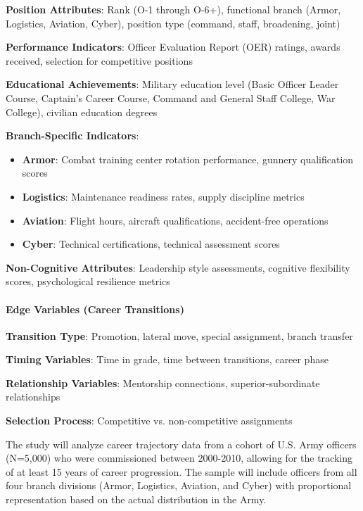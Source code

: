 \documentclass[../main.tex]{subfiles}
\begin{document}
\textbf{Position Attributes}: Rank (O-1 through O-6+), functional branch (Armor, Logistics, Aviation, Cyber), position type (command, staff, broadening, joint)

\textbf{Performance Indicators}: Officer Evaluation Report (OER) ratings, awards received, selection for competitive positions

\textbf{Educational Achievements}: Military education level (Basic Officer Leader Course, Captain's Career Course, Command and General Staff College, War College), civilian education degrees

\textbf{Branch-Specific Indicators}:
\begin{itemize}
\item \textbf{Armor}: Combat training center rotation performance, gunnery qualification scores
\item \textbf{Logistics}: Maintenance readiness rates, supply discipline metrics
\item \textbf{Aviation}: Flight hours, aircraft qualifications, accident-free operations
\item \textbf{Cyber}: Technical certifications, technical assessment scores
\end{itemize}

\textbf{Non-Cognitive Attributes}: Leadership style assessments, cognitive flexibility scores, psychological resilience metrics

\paragraph{Edge Variables (Career Transitions)}
\textbf{Transition Type}: Promotion, lateral move, special assignment, branch transfer

\textbf{Timing Variables}: Time in grade, time between transitions, career phase

\textbf{Relationship Variables}: Mentorship connections, superior-subordinate relationships

\textbf{Selection Process}: Competitive vs. non-competitive assignments


The study will analyze career trajectory data from a cohort of U.S. Army officers (N=5,000) who were commissioned between 2000-2010, allowing for the tracking of at least 15 years of career progression. The sample will include officers from all four branch divisions (Armor, Logistics, Aviation, and Cyber) with proportional representation based on the actual distribution in the Army.
\end{document}
